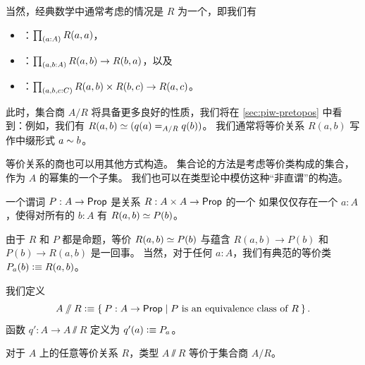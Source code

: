 当然，经典数学中通常考虑的情况是 $R$ 为一个，即我们有
%
%
%


\begin{itemize}
\item {}：$\prd{a:A} R(a,a)$，
\item {}：$\prd{a,b:A} R(a,b) \to R(b,a)$，以及
\item {}：$\prd{a,b,c:C} R(a,b) \times R(b,c) \to R(a,c)$。
\end{itemize}


%
此时，集合商 $A/R$ 将具备更多良好的性质，我们将在 \cref{sec:piw-pretopos} 中看到：例如，我们有 $R(a,b) \eqvsym (\id[A/R]{q(a)}{q(b)})$。
我们通常将等价关系 $R(a,b)$ 写作中缀形式 $a\eqr b$。

等价关系的商也可以用其他方式构造。
集合论的方法是考虑等价类构成的集合，作为 $A$ 的幂集的一个子集。
我们也可以在类型论中模仿这种``非直谓''的构造。

\begin{defn}
  一个谓词 $P:A\to\prop$ 是关系 $R : A \times A \to \prop$ 的一个
  如果仅仅存在一个 $a:A$，使得对所有的 $b:A$ 有 $\eqv{R(a,b)}{P(b)}$。
\end{defn}

由于 $R$ 和 $P$ 都是命题，等价 $\eqv{R(a,b)}{P(b)}$ 与蕴含 $R(a,b) \to P(b)$ 和 $P(b) \to R(a,b)$ 是一回事。
当然，对于任何 $a:A$，我们有典范的等价类 $P_a(b) \defeq R(a,b)$。

\begin{defn}\label{def:VVquotient}
  我们定义
  \begin{equation*}
    A\sslash R \defeq \setof{ P:A\to\prop | P \text{ is an equivalence class of } R}.
  \end{equation*}
  函数 $q':A\to A\sslash R$ 定义为 $q'(a) \defeq P_a$。
\end{defn}

\begin{thm}
  对于 $A$ 上的任意等价关系 $R$，类型 $A\sslash R$ 等价于集合商 $A/R$。
\end{thm}

